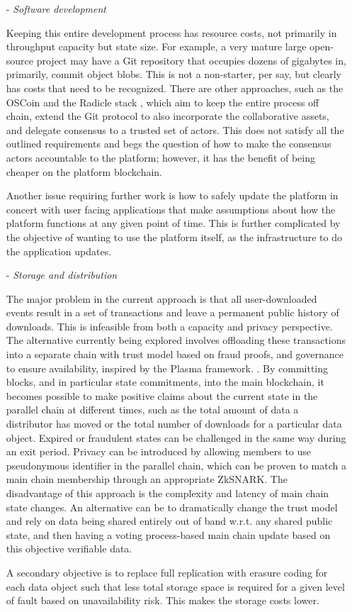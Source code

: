 \documentclass{article}
\begin{document}
\begin{itemize}
    \item[-] \textit{Software development}

    Keeping this entire development process has resource costs, not primarily in throughput capacity but state size. For example, a very mature large open-source project may have a Git repository that occupies dozens of gigabytes in, primarily, commit object blobs. This is not a non-starter, per say, but clearly has costs that need to be recognized. There are other approaches, such as the OSCoin and the Radicle stack \cite{oscoin},  which aim to keep the entire process off chain, extend the Git protocol to also incorporate the collaborative assets, and delegate consensus to a trusted set of actors. This does not satisfy all the outlined requirements and begs the question of how to make the consensus actors accountable to the platform; however, it has the benefit of being cheaper on the platform blockchain.

    Another issue requiring further work is how to safely update the platform in concert with user facing applications that make assumptions about how the platform functions at any given point of time. This is further complicated by the objective of wanting to use the platform itself, as the infrastructure to do the application updates.

    \item[-] \textit{Storage and distribution}

    The major problem in the current approach is that all user-downloaded events result in a set of transactions and leave a permanent public history of downloads. This is infeasible from both a capacity and privacy perspective. The alternative currently being explored involves offloading these transactions into a separate chain with trust model based on fraud proofs, and governance to ensure availability, inspired by the Plasma framework. \cite{poon2017plasma}. By committing blocks, and in particular state commitments, into the main blockchain, it becomes possible to make positive claims about the current state in the parallel chain at different times, such as the total amount of data a distributor has moved or the total number of downloads for a particular data object. Expired or fraudulent states can be challenged in the same way during an exit period. Privacy can be introduced by allowing members to use pseudonymous identifier in the parallel chain, which can be proven to match a main chain membership through an appropriate ZkSNARK. The disadvantage of this approach is the complexity and latency of main chain state changes. An alternative can be to dramatically change the trust model and rely on data being shared entirely out of band w.r.t. any shared public state, and then having a voting process-based main chain update based on this objective verifiable data.

    A secondary objective is to replace full replication with erasure coding for each data object \cite{reed1960polynomial} such that less total storage space is required for a given level of fault based on unavailability risk. This makes the storage costs lower.

\end{itemize}



\end{document}
